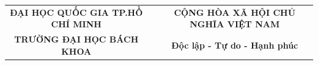 \thispagestyle{empty}

\fontsize{12pt}{14.4pt}\selectfont

\noindent
\begin{table}[!ht]
\centering
    \resizebox{\textwidth}{!}
    {
        \begin{tabular}{ccc}
        \textbf{ĐẠI HỌC QUỐC GIA TP.HỒ CHÍ MINH} & & \textbf{CỘNG HÒA XÃ HỘI CHỦ NGHĨA VIỆT NAM} \\
        \textbf{TRƯỜNG ĐẠI HỌC BÁCH KHOA}        & & \textbf{Độc lập - Tự do - Hạnh phúc}
        \end{tabular}
    }
\end{table}

\begingroup
\renewcommand{\arraystretch}{1} 

\newlength{\spanallbutone}
\setlength{\spanallbutone}{\dimexpr\textwidth-0.6cm-4\tabcolsep-3\arrayrulewidth\relax}

\newlength{\insttask}
\setlength{\insttask}{\dimexpr\textwidth-0.6cm-1.4cm-5.0cm-8\tabcolsep-5\arrayrulewidth\relax}

